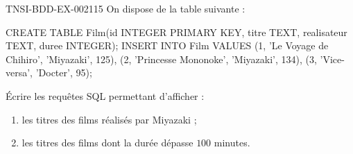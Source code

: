 \begin{exercice}{TNSI-BDD-EX-002}{1}{15}
On dispose de la table suivante :
\begin{sql}
CREATE TABLE Film(id INTEGER PRIMARY KEY, titre TEXT, realisateur TEXT, duree INTEGER);
INSERT INTO Film VALUES
  (1, 'Le Voyage de Chihiro', 'Miyazaki', 125),
  (2, 'Princesse Mononoke', 'Miyazaki', 134),
  (3, 'Vice-versa', 'Docter', 95);
\end{sql}
Écrire les requêtes SQL permettant d'afficher :
\begin{enumerate}
  \item les titres des films réalisés par Miyazaki ;
  \item les titres des films dont la durée dépasse $100$ minutes.
\end{enumerate}
\end{exercice}
